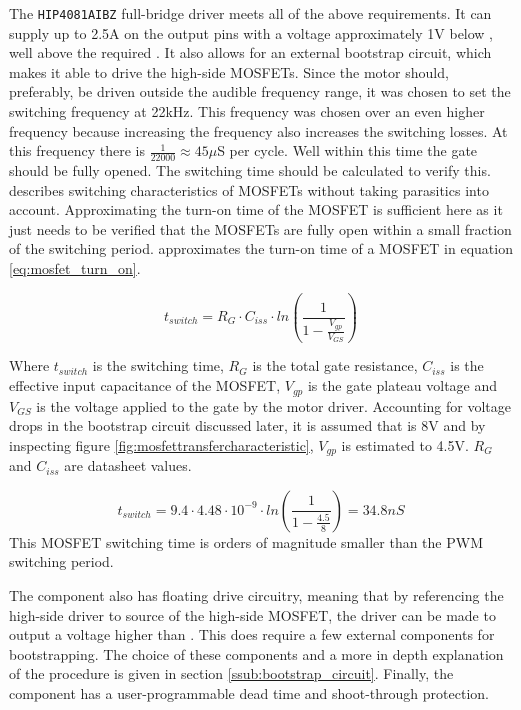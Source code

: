 The \texttt{HIP4081AIBZ} \cite{driver} full-bridge driver meets all of the above requirements.
It can supply up to 2.5A on the output pins with a voltage approximately 1V below \vcc, well above the required \vth.
It also allows for an external bootstrap circuit, which makes it able to drive the high-side MOSFETs.
Since the motor should, preferably, be driven outside the audible frequency range, it was chosen to set the switching frequency at 22kHz.
This frequency was chosen over an even higher frequency because increasing the frequency also increases the switching losses.
At this frequency there is $\frac{1}{22000}\approx45\mu$S per cycle. 
Well within this time the gate should be fully opened.
The switching time should be calculated to verify this.
\cite{mosfet_switch_app_note} describes switching characteristics of MOSFETs without taking parasitics into account.
Approximating the turn-on time of the MOSFET is sufficient here as it just needs to be verified that the MOSFETs are fully open within a small fraction of the switching period.
\cite{mosfet_switch_app_note} approximates the turn-on time of a MOSFET in equation \ref{eq:mosfet_turn_on}.

\begin{equation}
t_{switch} = R_G \cdot C_{iss} \cdot ln\left(\frac{1}{1-\frac{V_{gp}}{V_{GS}}}\right) 
\label{eq:mosfet_turn_on}
\end{equation}

Where $t_{switch}$ is the switching time, $R_G$ is the total gate resistance, $C_{iss}$ is the effective input capacitance of the
MOSFET, $V_{gp}$ is the gate plateau voltage and $V_{GS}$ is the voltage applied to the gate by the motor driver.
Accounting for voltage drops in the bootstrap circuit discussed later,  it is assumed that \vgs is 8V and by inspecting figure \ref{fig:mosfettransfercharacteristic}, $V_{gp}$ is estimated to 4.5V.
$R_G$ and $C_{iss}$ are   datasheet values.

\begin{equation}
t_{switch} = 9.4 \cdot 4.48 \cdot 10^{-9} \cdot ln\left(\frac{1}{1-\frac{4.5}{8}}\right) = 34.8 nS 
\label{eq:mosfet_turn_on_values}
\end{equation}
This MOSFET switching time is orders of magnitude smaller than the PWM switching period.

The component also has floating drive circuitry, meaning that by referencing the high-side driver to source of the high-side MOSFET, the driver can be made to output a voltage higher than \vcc.
This does require a few external components for bootstrapping.
The choice of these components and a more in depth explanation of the procedure is given in section \ref{ssub:bootstrap_circuit}.
Finally, the component has a user-programmable dead time and shoot-through protection. 

